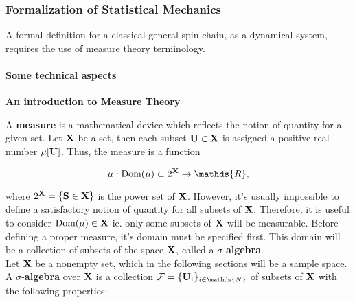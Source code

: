 \documentclass{homework}
\begin{document}

\subsubsection{Formalization of Statistical Mechanics}

A formal definition for a classical general spin chain, as a dynamical system, requires the use of measure theory terminology. \\

\paragraph{\textbf{Some technical aspects}} 
\underline{\textbf{An introduction to Measure Theory}}

A \textbf{measure} is a mathematical device which reflects the notion of quantity for a given set. Let ${\bf X}$ be a set, then each subset ${\bf U} \in {\bf X}$ is assigned a positive real number $\mu[{\bf U}]$. Thus, the measure is a function

$$
\mu: \textnormal{Dom}(\mu) \subset 2^{\bf X} \rightarrow \mathds{R},
$$

where $2^{\bf X} = \{{\bf S} \in {\bf X}\}$ is the power set of ${\bf X}$. However, it's usually impossible to define a satisfactory notion of quantity for all subsets of ${\bf X}$. Therefore, it is useful to consider 
$\textnormal{Dom}(\mu) \in {\bf X}$ ie. only some subsets of ${\bf X}$ will be measurable. Before defining a proper measure, it's domain must be specified first. This domain will be a collection of subsets of the space ${\bf X}$, called a $\sigma$-\textbf{algebra}. \\

Let ${\bf X}$ be a nonempty set, which in the following sections will be a sample space. A $\sigma$-\textbf{algebra} over ${\bf X}$ is a collection $\mathcal{F} = \{{\bf U}_i\}_{i \in \mathds{N}}$ of subsets of ${\bf X}$ with the following properties:
\end{document}
